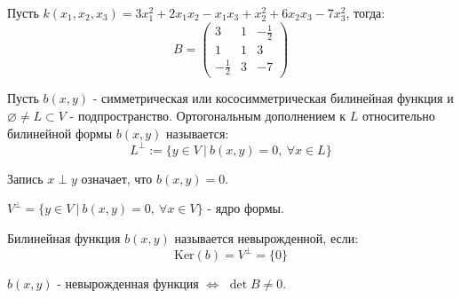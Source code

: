 \begin{example1}
    Пусть $k(x_1,x_2, x_3)=3x_1^2+2x_1x_2-x_1x_3+x_2^2+6x_2x_3-7x_3^2$, тогда:
        $$B=\begin{pmatrix}
        3 & 1 & -\frac{1}{2}\\
        1 & 1 &  3\\
        -\frac{1}{2} &  3 & -7
        \end{pmatrix}$$
\end{example1}
\begin{definition}
    Пусть $b(x,y)$ - симметрическая или кососимметрическая билинейная функция и $\varnothing \neq L \subset V$ - подпространство. Ортогональным дополнением к $L$ относительно билинейной формы $b(x,y)$ называется: 
    $$L^{\perp}:=\{y\in V \ | \ b(x,y)=0, \ \forall x\in L\}$$
\end{definition}
\begin{remark}
    Запись $x\perp y$ означает, что $b(x,y)=0$.
\end{remark}
\begin{definition}
    $V^{\perp}=\{y\in V \ | \ b(x,y)=0, \ \forall x\in V\}$ - ядро формы.
\end{definition}
\begin{definition}
    Билинейная функция $b(x,y)$ называется невырожденной, если: 
    $$\text{Ker}(b)=V^{\perp}=\{0\}$$
\end{definition}
\begin{exercise}
    $b(x,y)$ - невырожденная функция $\Longleftrightarrow$ $\det B\neq0$.
\end{exercise}
